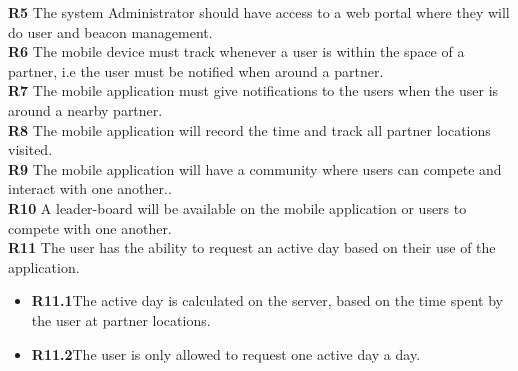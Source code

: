 \documentclass[11pt]{article}
\begin{document}
\textbf{R5} The system Administrator should have access to a web portal where they will do user and beacon management. \\
\textbf{R6} The mobile device must track whenever a user is within the space of a partner, i.e the user must be notified when around a partner. \\
\textbf{R7} The mobile application must give notifications to the users when the user is around a nearby partner. \\
\textbf{R8} The mobile application will record the time and track all partner locations visited. \\
\textbf{R9} The mobile application will have a community where users can compete and interact with one another..\\
\textbf{R10} A leader-board will be available on the mobile application or users to compete with one another.  \\
\textbf{R11} The user has the ability to request an active day based on their use of the application.
\begin{itemize}	
	\item \textbf{R11.1}The active day is calculated on the server, based on the time spent by the user at partner locations.
	\item \textbf{R11.2}The user is only allowed to request one active day a day. 	
\end{itemize}
\end{document}
